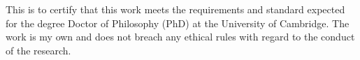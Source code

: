 \noindent This is to certify that this work meets the requirements and standard expected for the degree Doctor of Philosophy (PhD) at the University of Cambridge. The work is my own and does not breach any ethical rules with regard to the conduct of the research.
\\\\\\\\\\
\noindent {} \hfill
